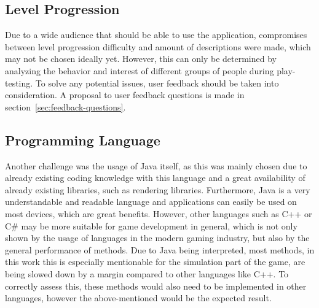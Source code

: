 \subsection{Level Progression}\label{subsec:level-progression}
Due to a wide audience that should be able to use the application, compromises between level progression difficulty and
amount of descriptions were made, which may not be chosen ideally yet.
However, this can only be determined by analyzing the behavior and interest of different groups of people during play-testing.
To solve any potential issues, user feedback should be taken into consideration.
A proposal to user feedback questions is made in section~\ref{sec:feedback-questions}.
\subsection{Programming Language}\label{subsec:programming-language}
Another challenge was the usage of Java itself, as this was mainly chosen due to already existing coding knowledge with this
language and a great availability of already existing libraries, such as rendering libraries.
Furthermore, Java is a very understandable and readable language and applications can easily be used on most devices, which are great benefits.
However, other languages such as C++ or C\# may be more suitable for game development in general, which is not only shown by
the usage of languages in the modern gaming industry, but
also by the general performance of methods.
Due to Java being interpreted, most methods, in this work this is especially mentionable for the simulation part of the game, are being slowed down
by a margin compared to other languages like C++.
To correctly assess this, these methods would also need to be implemented in other languages, however the above-mentioned would
be the expected result.
